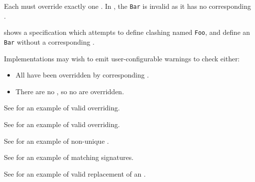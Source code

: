 Each \Proseimplementationsubprogram{} must override exactly one \Proseimpdefsubprogram.
In , the \Proseimplementationsubprogram{} \verb|Bar| is
invalid as it has no corresponding \Proseimpdefsubprogram{}.

 shows a specification which attempts to define clashing
\Proseimplementationsubprograms{} named \verb|Foo|, and define an
\Proseimplementationsubprogram{} \verb|Bar| without a corresponding \Proseimpdefsubprogram{}.

\noindent
Implementations may wish to emit user-configurable warnings to check either:
\begin{itemize}
  \item All \Proseimpdefsubprograms{} have been overridden by corresponding \Proseimplementationsubprograms{}.
  \item There are no \Proseimplementationsubprograms{}, so no \Proseimpdefsubprograms{} are overridden.
\end{itemize}

See  for an example of valid overriding.


See  for an example of valid overriding.


See  for an example of non-unique \Proseimplementationsubprograms{}.


See  for an example of matching signatures.


See  for an example of valid replacement of an \Proseimplementationsubprogram{}.

